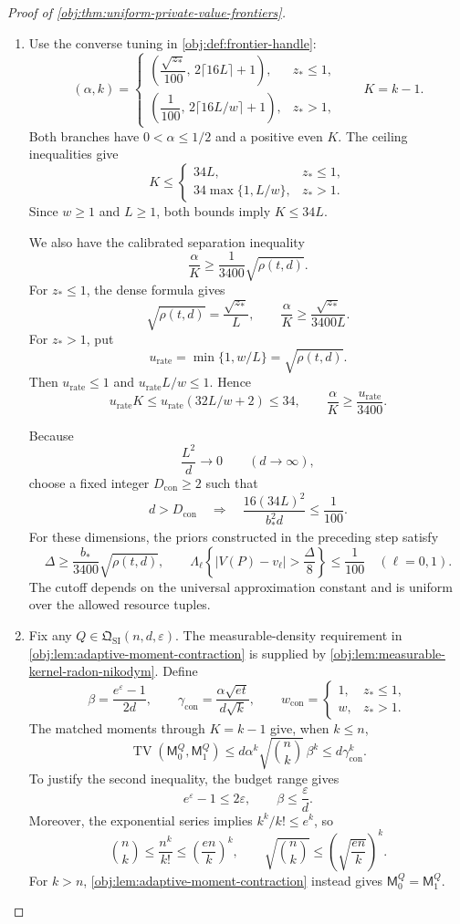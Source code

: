 \begin{proof}[Proof of \cref{obj:thm:uniform-private-value-frontiers}]
\begin{enumerate}
\item
Use the converse tuning in \cref{obj:def:frontier-handle}:
\[
(\alpha,k)=
\begin{cases}
\left(\dfrac{\sqrt{z_*}}{100},\,2\lceil16L\rceil+1\right),
&z_*\le1,\\[3pt]
\left(\dfrac1{100},\,2\lceil16L/w\rceil+1\right),
&z_*>1,
\end{cases}
\qquad K=k-1.
\]
Both branches have \(0<\alpha\le1/2\) and a positive even \(K\).
The ceiling inequalities give
\[
K\le
\begin{cases}
34L,&z_*\le1,\\
34\max\{1,L/w\},&z_*>1.
\end{cases}
\]
Since \(w\ge1\) and \(L\ge1\), both bounds imply \(K\le34L\).

We also have the calibrated separation inequality
\[
\frac{\alpha}{K}\ge\frac1{3400}\sqrt{\rho(t,d)}.
\]
For \(z_*\le1\), the dense formula gives
\[
\sqrt{\rho(t,d)}=\frac{\sqrt{z_*}}{L},
\qquad
\frac{\alpha}{K}
\ge\frac{\sqrt{z_*}}{3400L}.
\]
For \(z_*>1\), put
\[
u_{\mathrm{rate}}=\min\{1,w/L\}=\sqrt{\rho(t,d)}.
\]
Then \(u_{\mathrm{rate}}\le1\) and
\(u_{\mathrm{rate}}L/w\le1\). Hence
\[
u_{\mathrm{rate}}K
\le u_{\mathrm{rate}}(32L/w+2)\le34,
\qquad
\frac{\alpha}{K}\ge\frac{u_{\mathrm{rate}}}{3400}.
\]

Because
\[
\frac{L^2}{d}\longrightarrow0\qquad(d\longrightarrow\infty),
\]
choose a fixed integer \(D_{\mathrm{con}}\ge2\) such that
\[
d>D_{\mathrm{con}}
\quad\Longrightarrow\quad
\frac{16(34L)^2}{b_*^2d}\le\frac1{100}.
\]
For these dimensions, the priors constructed in the preceding step satisfy
\[
\Delta\ge\frac{b_*}{3400}\sqrt{\rho(t,d)},
\qquad
\Lambda_\ell\!\left\{|V(P)-v_\ell|>\frac{\Delta}{8}\right\}
\le\frac1{100}
\quad(\ell=0,1).
\]
The cutoff depends on the universal approximation constant and is uniform over the allowed resource tuples.

\item
Fix any \(Q\in\mathfrak Q_{\mathrm{SI}}(n,d,\varepsilon)\). The measurable-density requirement in \cref{obj:lem:adaptive-moment-contraction} is supplied by \cref{obj:lem:measurable-kernel-radon-nikodym}. Define
\[
\beta=\frac{e^\varepsilon-1}{2d},
\qquad
\gamma_{\mathrm{con}}
=\frac{\alpha\sqrt{et}}{d\sqrt{k}},
\qquad
w_{\mathrm{con}}=
\begin{cases}
1,&z_*\le1,\\
w,&z_*>1.
\end{cases}
\]
The matched moments through \(K=k-1\) give, when \(k\le n\),
\[
\operatorname{TV}(\mathsf M_0^Q,\mathsf M_1^Q)
\le d\alpha^k\sqrt{\binom nk}\,\beta^k
\le d\gamma_{\mathrm{con}}^k.
\]
To justify the second inequality, the budget range gives
\[
e^\varepsilon-1\le2\varepsilon,
\qquad \beta\le\frac{\varepsilon}{d}.
\]
Moreover, the exponential series implies \(k^k/k!\le e^k\), so
\[
\binom nk\le\frac{n^k}{k!}\le\left(\frac{en}{k}\right)^k,
\qquad
\sqrt{\binom nk}\le\left(\sqrt{\frac{en}{k}}\right)^k.
\]
For \(k>n\), \cref{obj:lem:adaptive-moment-contraction} instead gives
\(\mathsf M_0^Q=\mathsf M_1^Q\).


\end{enumerate}
\end{proof}
